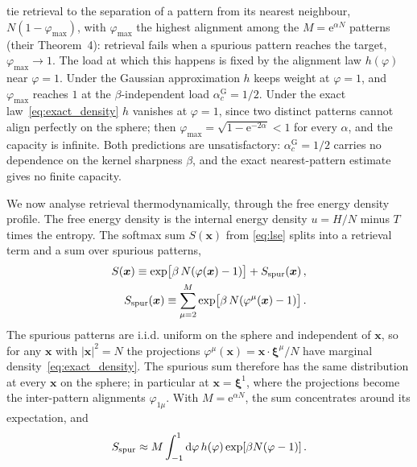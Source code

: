 \documentclass[letterpaper]{article} %
\newcommand{\bxi}{\boldsymbol{\xi}}
\newcommand{\bx}{\bm{x}}
\newcommand{\e}{{\mathrm{e}}}
\newcommand{\dd}{{\mathrm{d}}}
\newcommand{\Bnet}{\beta}
\newcommand{\acGauss}{\alpha_c^{\mathrm{G}}}
\begin{document}
\citet{ramsauer2021hopfield} tie retrieval to the separation of a pattern from its
nearest neighbour, $N(1-\varphi_{\max})$, with $\varphi_{\max}$ the highest alignment
among the $M=\e^{\alpha N}$ patterns (their Theorem~4): retrieval fails when a
spurious pattern reaches the target, $\varphi_{\max}\to1$. The load at which
this happens is fixed by the alignment law $h(\varphi)$ near $\varphi=1$.
Under the Gaussian approximation $h$ keeps weight at $\varphi=1$, and $\varphi_{\max}$
reaches $1$ at the $\Bnet$-independent load $\acGauss=1/2$. Under the exact
law~\eqref{eq:exact_density} $h$ vanishes at $\varphi=1$, since two distinct patterns
cannot align perfectly on the sphere; then $\varphi_{\max}=\sqrt{1-\e^{-2\alpha}}<1$ for
every $\alpha$, and the capacity is infinite. Both predictions are unsatisfactory: 
$\acGauss=1/2$ carries no dependence on
the kernel sharpness $\Bnet$, and the exact nearest-pattern estimate gives no
finite capacity. 

We now analyse retrieval thermodynamically, through the free energy density profile.
The free energy density is the internal energy density $u = H/N$ minus $T$ times the entropy.
The softmax sum $S(\bx)$ from \eqref{eq:lse} splits into a retrieval term and a sum over spurious patterns,
\begin{align} 
S(\bx) \equiv \exp\!\big[\Bnet\,N (\varphi(\bx)-1) \big] + S_{\rm spur}(\bx)\,,\label{eq:softmax_sum}\\
S_{\rm spur}(\bx) \equiv \sum_{\mu=2}^{M}\exp\!\big[\Bnet\,N (\varphi^\mu(\bx)-1) \big]\,. \label{eq:spur_sum}
\end{align}
The spurious patterns are i.i.d. uniform on the sphere and independent of $\bx$, so for any $\bx$ with $|\bx|^2=N$ 
the projections $\varphi^\mu(\bx)=\bx\cdot\bxi^\mu/N$ have marginal density~\eqref{eq:exact_density}. 
The spurious sum therefore has the same distribution at every $\bx$ on the sphere; in particular
at $\bx=\bxi^1$, where the projections become the inter-pattern alignments $\varphi_{1\mu}$. With $M=\e^{\alpha N}$, 
the sum concentrates around its expectation, and 
\begin{equation} 
    S_{\rm spur} \approx M\int_{-1}^1 \dd\varphi\, h(\varphi)\exp[\Bnet N(\varphi-1)]\,.
    \label{eq:spur_integral}
\end{equation}
\end{document}
